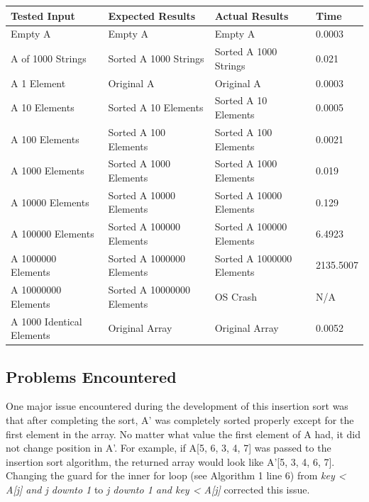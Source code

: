 \documentclass[onecolumn, 12pt, article]{IEEEtran}
\numberwithin{case}{problem}
\numberwithin{condition}{problem}
\numberwithin{condition}{subsection}
\numberwithin{definition}{section}
\theoremstyle{remark}
\numberwithin{question}{problem}
\theoremstyle{plain}
\numberwithin{answer}{problem}
\numberwithin{solution}{section}
\numberwithin{equation}{section}%
\begin{document}
\begin{center}
\begin{tabular}{|l|l|l|l|}
\hline Tested Input & Expected Results & Actual Results & Time \\
\hline Empty A & Empty A & Empty A & 0.0003 \\
\hline A of 1000 Strings & Sorted A 1000 Strings & Sorted A 1000 Strings & 0.021 \\
\hline A 1 Element & Original A & Original A & 0.0003 \\
\hline A 10 Elements & Sorted A 10 Elements & Sorted A 10 Elements & 0.0005 \\
\hline A 100 Elements & Sorted A 100 Elements & Sorted A 100 Elements & 0.0021 \\
\hline A 1000 Elements & Sorted A 1000 Elements & Sorted A 1000 Elements & 0.019 \\
\hline A 10000 Elements & Sorted A 10000 Elements & Sorted A 10000 Elements & 0.129 \\
\hline A 100000 Elements & Sorted A 100000 Elements & Sorted A 100000 Elements & 6.4923 \\
\hline A 1000000 Elements & Sorted A 1000000 Elements & Sorted A 1000000 Elements & 2135.5007 \\
\hline A 10000000 Elements & Sorted A 10000000 Elements & OS Crash & N/A \\
\hline A 1000 Identical Elements & Original Array & Original Array & 0.0052 \\
\hline
\end{tabular}
\end{center}

\subsection{Problems Encountered}
One major issue encountered during the development of this insertion sort was that after completing the sort, A' was completely sorted properly except for the first element in the array. No matter what value the first element of A had, it did not change position in A'. For example, if A[5, 6, 3, 4, 7] was passed to the insertion sort algorithm, the returned array would look like A'[5, 3, 4, 6, 7]. Changing the guard for the inner for loop (see Algorithm 1 line 6) from \textit{key < A[j] and j downto 1} to \textit{j downto 1 and key < A[j]} corrected this issue.

\end{document}
